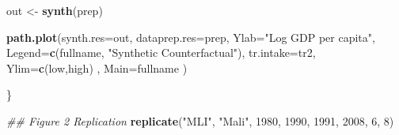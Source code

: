 \documentclass[]{article}
\newenvironment{Shaded}{\begin{snugshade}}{\end{snugshade}}
\newcommand{\CommentTok}[1]{\textcolor[rgb]{0.56,0.35,0.01}{\textit{#1}}}
\newcommand{\DataTypeTok}[1]{\textcolor[rgb]{0.13,0.29,0.53}{#1}}
\newcommand{\DecValTok}[1]{\textcolor[rgb]{0.00,0.00,0.81}{#1}}
\newcommand{\KeywordTok}[1]{\textcolor[rgb]{0.13,0.29,0.53}{\textbf{#1}}}
\newcommand{\NormalTok}[1]{#1}
\newcommand{\StringTok}[1]{\textcolor[rgb]{0.31,0.60,0.02}{#1}}
\begin{document}
\begin{Shaded}
\begin{Highlighting}[]
\NormalTok{  out <-}\StringTok{ }\KeywordTok{synth}\NormalTok{(prep)}
  
  \KeywordTok{path.plot}\NormalTok{(}\DataTypeTok{synth.res=}\NormalTok{out, }\DataTypeTok{dataprep.res=}\NormalTok{prep,}
            \DataTypeTok{Ylab=}\StringTok{"Log GDP per capita"}\NormalTok{, }\DataTypeTok{Legend=}\KeywordTok{c}\NormalTok{(fullname, }\StringTok{"Synthetic Counterfactual"}\NormalTok{), }\DataTypeTok{tr.intake=}\NormalTok{tr2,}
            \DataTypeTok{Ylim=}\KeywordTok{c}\NormalTok{(low,high) , }\DataTypeTok{Main=}\NormalTok{fullname}
\NormalTok{  )}
  
\NormalTok{\}}
\end{Highlighting}
\end{Shaded}

\begin{Shaded}
\begin{Highlighting}[]
\CommentTok{## Figure 2 Replication}
\KeywordTok{replicate}\NormalTok{(}\StringTok{"MLI"}\NormalTok{, }\StringTok{"Mali"}\NormalTok{, }\DecValTok{1980}\NormalTok{, }\DecValTok{1990}\NormalTok{, }\DecValTok{1991}\NormalTok{, }\DecValTok{2008}\NormalTok{, }\DecValTok{6}\NormalTok{, }\DecValTok{8}\NormalTok{)  }
\end{Highlighting}
\end{Shaded}
\end{document}
